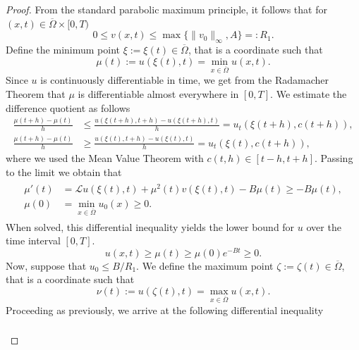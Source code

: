 \documentclass[12pt, a4paper]{article}
\theoremstyle{break}
\theoremstyle{break}
\theoremstyle{break}
\theoremstyle{break}
\theoremstyle{break}
\theoremstyle{break}
\theoremstyle{break}
\begin{document}
\begin{proof}
    From the standard parabolic maximum principle, it follows that for $(x, t) \in \overline{\Omega} \times [0, T)$
    \begin{equation}
        \label{EQ:AprioriEstimate_V}
        0 \leq v(x, t) \leq \max\{\|v_0\|_\infty, A\} =: R_1.
    \end{equation}
    Define the minimum point $\xi := \xi(t) \in \overline{\Omega}$, that is a coordinate such that 
    \begin{equation*}
        \mu(t) := u(\xi(t), t) = \min_{x \in \overline{\Omega}} u(x, t).
    \end{equation*}
    Since $u$ is continuously differentiable in time, we get from the Radamacher Theorem that $\mu$ is differentiable almost everywhere in $[0, T]$. We estimate the difference quotient as follows
    \begin{align*}
        \frac{\mu(t+h) - \mu(t)}{h} &\leq \frac{u(\xi(t+h), t+h) - u(\xi(t + h), t)}{h} = u_t(\xi(t + h), c(t+h)), \\
        \frac{\mu(t+h) - \mu(t)}{h} &\geq \frac{u(\xi(t), t+h) - u(\xi(t), t)}{h} = u_t(\xi(t), c(t+h)),
    \end{align*}
    where we used the Mean Value Theorem with $c(t, h) \in [t-h, t+h]$. Passing to the limit we obtain that
    \begin{align}
        \begin{split}
            \mu'(t) &= \mathcal{L} u(\xi(t), t) + \mu^2(t) v(\xi(t), t) - B \mu(t) \geq - B \mu(t), \\
            \mu(0) &= \min_{x \in \overline{\Omega}} u_0(x) \geq 0.
        \end{split}
    \end{align}
    When solved, this differential inequality yields the lower bound for $u$ over the time interval $[0, T]$.
    \begin{equation*}
        u(x,t) \geq \mu(t) \geq \mu(0) e^{-B t} \geq 0.
    \end{equation*}
    Now, suppose that $u_0 \leq B / R_1$. We define the maximum point $\zeta := \zeta(t) \in \overline{\Omega}$, that is a coordinate such that
    \begin{equation*}
        \nu(t) := u(\zeta(t), t) = \max_{x \in \overline{\Omega}} u(x,t).
    \end{equation*}
    Proceeding as previously, we arrive at the following differential inequality
    \begin{align}
        \begin{split}

\end{split}
\end{align}
\end{proof}
\end{document}
